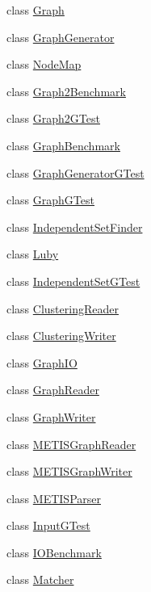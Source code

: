 \begin{DoxyCompactItemize}
\item 
class \hyperlink{class_networ_kit_1_1_graph}{Graph}
\item 
class \hyperlink{class_networ_kit_1_1_graph_generator}{Graph\-Generator}
\item 
class \hyperlink{class_networ_kit_1_1_node_map}{Node\-Map}
\item 
class \hyperlink{class_networ_kit_1_1_graph2_benchmark}{Graph2\-Benchmark}
\item 
class \hyperlink{class_networ_kit_1_1_graph2_g_test}{Graph2\-G\-Test}
\item 
class \hyperlink{class_networ_kit_1_1_graph_benchmark}{Graph\-Benchmark}
\item 
class \hyperlink{class_networ_kit_1_1_graph_generator_g_test}{Graph\-Generator\-G\-Test}
\item 
class \hyperlink{class_networ_kit_1_1_graph_g_test}{Graph\-G\-Test}
\item 
class \hyperlink{class_networ_kit_1_1_independent_set_finder}{Independent\-Set\-Finder}
\item 
class \hyperlink{class_networ_kit_1_1_luby}{Luby}
\item 
class \hyperlink{class_networ_kit_1_1_independent_set_g_test}{Independent\-Set\-G\-Test}
\item 
class \hyperlink{class_networ_kit_1_1_clustering_reader}{Clustering\-Reader}
\item 
class \hyperlink{class_networ_kit_1_1_clustering_writer}{Clustering\-Writer}
\item 
class \hyperlink{class_networ_kit_1_1_graph_i_o}{Graph\-I\-O}
\item 
class \hyperlink{class_networ_kit_1_1_graph_reader}{Graph\-Reader}
\item 
class \hyperlink{class_networ_kit_1_1_graph_writer}{Graph\-Writer}
\item 
class \hyperlink{class_networ_kit_1_1_m_e_t_i_s_graph_reader}{M\-E\-T\-I\-S\-Graph\-Reader}
\item 
class \hyperlink{class_networ_kit_1_1_m_e_t_i_s_graph_writer}{M\-E\-T\-I\-S\-Graph\-Writer}
\item 
class \hyperlink{class_networ_kit_1_1_m_e_t_i_s_parser}{M\-E\-T\-I\-S\-Parser}
\item 
class \hyperlink{class_networ_kit_1_1_input_g_test}{Input\-G\-Test}
\item 
class \hyperlink{class_networ_kit_1_1_i_o_benchmark}{I\-O\-Benchmark}
\item 
class \hyperlink{class_networ_kit_1_1_matcher}{Matcher}

\end{DoxyCompactItemize}
